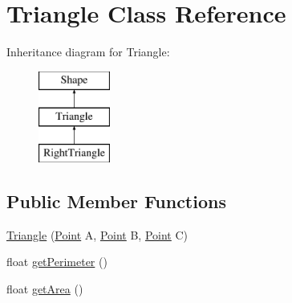 \hypertarget{class_triangle}{}\section{Triangle Class Reference}
\label{class_triangle}
Inheritance diagram for Triangle\+:\begin{figure}[H]
\begin{center}
\leavevmode
\includegraphics[height=3.000000cm]{class_triangle}
\end{center}
\end{figure}
\subsection*{Public Member Functions}
\begin{DoxyCompactItemize}
\item 
\mbox{\hyperlink{class_triangle_ae015b2eea88192163bb6e7cd93a81a35}{Triangle}} (\mbox{\hyperlink{class_point}{Point}} A, \mbox{\hyperlink{class_point}{Point}} B, \mbox{\hyperlink{class_point}{Point}} C)
\item 
float \mbox{\hyperlink{class_triangle_aa28529a1652a1e2d75e972a5f4250f46}{get\+Perimeter}} ()
\item 
float \mbox{\hyperlink{class_triangle_a2e0ddcfb4824ea5c6a001c230c09c66c}{get\+Area}} ()
\end{DoxyCompactItemize}
